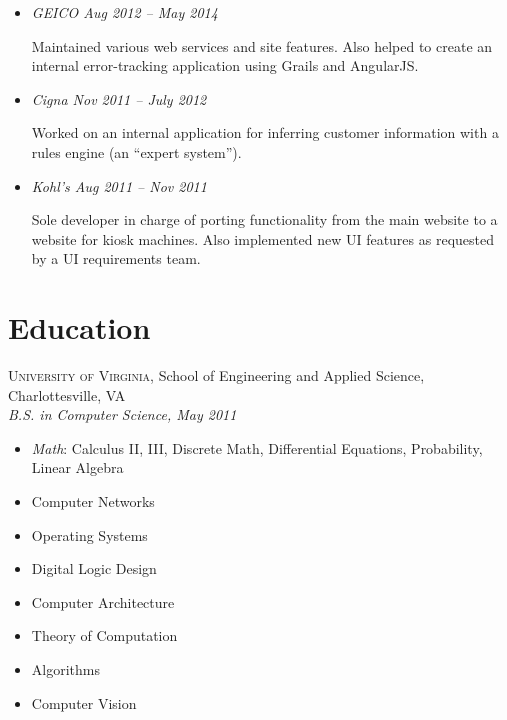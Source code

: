 \documentclass[12pt]{article}
\begin{document}
  \begin{itemize}

    \item \textit{GEICO \hfill Aug 2012 -- May 2014}

      Maintained various web services and site features. Also helped to create
      an internal error-tracking application using Grails and AngularJS.

          
       

    \item \textit{Cigna \hfill Nov 2011 -- July 2012}

      Worked on an internal application for inferring customer information with
      a rules engine (an ``expert system'').

       

    \item \textit{Kohl's \hfill Aug 2011 -- Nov 2011}

      Sole developer in charge of porting functionality from the main website to
      a website for kiosk machines. Also implemented new UI features as
      requested by a UI requirements team.

       

  \end{itemize}


\section*{Education}

  \textsc{University of Virginia}, School of Engineering and Applied Science,
  Charlottesville, VA \\
  \textit{B.S. in Computer Science, May 2011}

  \begin{multicols}{3}
    \raggedright

    \begin{itemize}
    \item \textit{Math}: Calculus II, III, Discrete Math, Differential
      Equations, Probability, Linear Algebra
    \item Computer Networks
    \item Operating Systems
    \item Digital Logic Design
    \item Computer Architecture
    \item Theory of Computation
    \item Algorithms
    \item Computer Vision
    \end{itemize}
  \end{multicols}
\end{document}
